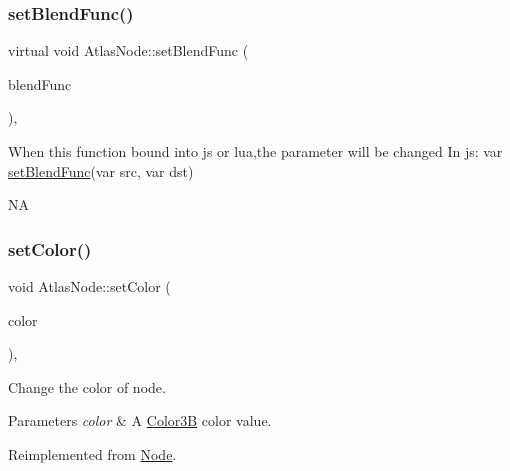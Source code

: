 \subsubsection{\texorpdfstring{set\+Blend\+Func()}{setBlendFunc()}\hspace{0.1cm}{\footnotesize\ttfamily [2/2]}}
{\footnotesize\ttfamily virtual void Atlas\+Node\+::set\+Blend\+Func (\begin{DoxyParamCaption}\item[{const \hyperlink{structBlendFunc}{Blend\+Func} \&}]{blend\+Func }\end{DoxyParamCaption})\hspace{0.3cm}{\ttfamily [override]}, {\ttfamily [virtual]}}


\begin{DoxyCode}
When \textcolor{keyword}{this} \textcolor{keyword}{function} bound into js or lua,the parameter will be changed
In js: var \hyperlink{classAtlasNode_ad6f8b156ff845f7ffd08179e3a5af035}{setBlendFunc}(var src, var dst)
\end{DoxyCode}
  NA \mbox{\label{classAtlasNode_a67a26fd695101fe4efa0533cb3dc9f39}} 
\subsubsection{\texorpdfstring{set\+Color()}{setColor()}\hspace{0.1cm}{\footnotesize\ttfamily [1/2]}}
{\footnotesize\ttfamily void Atlas\+Node\+::set\+Color (\begin{DoxyParamCaption}\item[{const \hyperlink{structColor3B}{Color3B} \&}]{color }\end{DoxyParamCaption})\hspace{0.3cm}{\ttfamily [override]}, {\ttfamily [virtual]}}

Change the color of node. 
\begin{DoxyParams}{Parameters}
{\em color} & A \hyperlink{structColor3B}{Color3B} color value. \\
\hline
\end{DoxyParams}


Reimplemented from \hyperlink{classNode_af45037de5b13602263b1ce51b50cafdd}{Node}.

\mbox{\label{classAtlasNode_a4205343f55700284ffba22a2988c5445}} 
